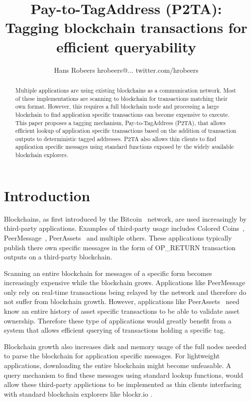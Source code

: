\documentclass[a4paper,10pt]{article}
\title{Pay-to-TagAddress (P2TA): Tagging blockchain transactions for efficient queryability}
\author{Hans Robeers hrobeers@... twitter.com/hrobeers}
\begin{document}
\maketitle

\begin{abstract}
Multiple applications are using existing blockchains as a communication network.
Most of these implementations are scanning to blockchain for transactions matching their own format.
However, this requires a full blockchain node and processing a large blockchain to find application specific transactions can become expensive to execute.
This paper proposes a tagging mechanism, Pay-to-TagAddress (P2TA), that allows efficient lookup of application specific transactions based on the addition of transaction outputs to deterministic tagged addresses. P2TA also allows thin clients to find application specific messages using standard functions exposed by the widely available blockchain explorers.
\end{abstract}

\doclicenseThis

\section{Introduction}
Blockchains, as first introduced by the Bitcoin~\cite{Nak08} network, are used increasingly by third-party applications.
Examples of third-party usage includes Colored Coins~\cite{Ros12}, PeerMessage~\cite{Emeth}, PeerAssets~\cite{Pchem} and multiple others.
These applications typically publish there own specific messages in the form of OP\_RETURN transaction outputs on a third-party blockchain.

Scanning an entire blockchain for messages of a specific form becomes increasingly expensive while the blockchain grows.
Applications like PeerMessage~\cite{Emeth} only rely on real-time transactions being relayed by the network and therefore do not suffer from blockchain growth.
However, applications like PeerAssets~\cite{Pchem} need know an entire history of asset specific transactions to be able to validate asset ownership.
Therefore these type of applications would greatly benefit from a system that allows efficient querying of transactions holding a specific tag.

Blockchain growth also increases disk and memory usage of the full nodes needed to parse the blockchain for application specific messages. For lightweight applications, downloading the entire blockchain might become unfeasable. A query mechanism to find these messages using standard lookup functions, would allow these third-party applictions to be implemented as thin clients interfacing with standard blockchain explorers like blockr.io \cite{Blockr}.
\end{document}
